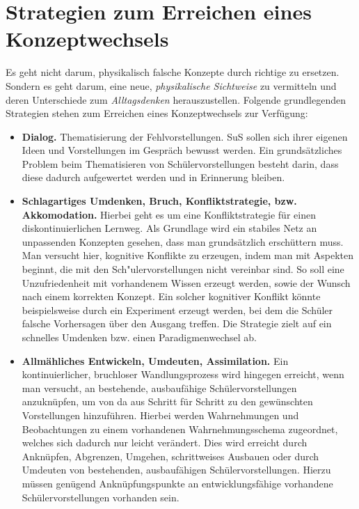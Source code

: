 \bip\bip
\section{Strategien zum Erreichen eines Konzeptwechsels}
Es geht nicht darum, physikalisch falsche Konzepte durch richtige zu ersetzen. Sondern es geht darum, eine neue, \emph{physikalische Sichtweise} zu vermitteln und deren Unterschiede zum \emph{Alltagsdenken} herauszustellen. Folgende grundlegenden Strategien stehen zum Erreichen eines Konzeptwechsels zur Verf{\"u}gung:

\begin{itemize}
\item \textbf{Dialog.} Thematisierung der Fehlvorstellungen. SuS sollen sich ihrer eigenen Ideen und Vorstellungen im Gespr{\"a}ch bewusst werden.  Ein grunds{\"a}tzliches Problem beim Thematisieren von Sch\"{u}lervorstellungen besteht darin, dass diese dadurch aufgewertet werden und in Erinnerung bleiben. 


\item \textbf{Schlagartiges Umdenken, Bruch, Konfliktstrategie, bzw. Akkomodation.} Hierbei geht es um eine Konfliktstrategie f{\"u}r einen diskontinuierlichen Lernweg. Als Grundlage wird ein stabiles Netz an unpassenden Konzepten gesehen, dass man grunds{\"a}tzlich ersch{\"u}ttern muss. Man versucht hier, kognitive Konflikte zu erzeugen, indem man mit Aspekten beginnt, die mit den Sch{"u}lervorstellungen nicht vereinbar sind. So soll eine Unzufriedenheit mit vorhandenem Wissen erzeugt werden, sowie der Wunsch nach einem korrekten Konzept.  Ein solcher kognitiver Konflikt k\"{o}nnte beispielsweise durch ein Experiment erzeugt werden, bei dem die Sch\"{u}ler falsche Vorhersagen \"{u}ber den Ausgang treffen. Die Strategie zielt auf ein schnelles Umdenken bzw. einen Paradigmenwechsel ab. 

\item \textbf{Allm\"{a}hliches Entwickeln, Umdeuten, Assimilation.}  Ein kontinuierlicher, bruchloser Wandlungsprozess wird hingegen erreicht, wenn man versucht, an bestehende, ausbauf\"{a}hige Sch\"{u}lervorstellungen anzukn\"{u}pfen, um von da aus Schritt f\"{u}r Schritt zu den gew\"{u}nschten Vorstellungen hinzuf\"{u}hren. Hierbei werden Wahrnehmungen und Beobachtungen zu einem vorhandenen Wahrnehmungsschema zugeordnet, welches sich dadurch nur leicht ver\"{a}ndert. Dies wird erreicht durch Ankn\"{u}pfen, Abgrenzen, Umgehen, schrittweises Ausbauen oder durch Umdeuten von bestehenden, ausbauf\"{a}higen  Sch\"{u}lervorstellungen. Hierzu m\"{u}ssen gen\"{u}gend Ankn\"{u}pfungspunkte an entwicklungsf\"{a}hige vorhandene Sch\"{u}lervorstellungen vorhanden sein. 


\end{itemize}
